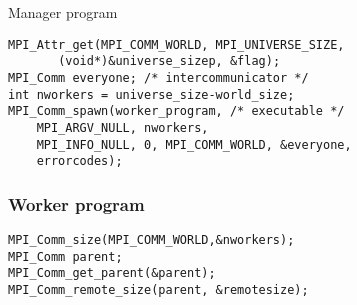 \begin{frame}[containsverbatim]{Manager program}
\begin{lstlisting}
MPI_Attr_get(MPI_COMM_WORLD, MPI_UNIVERSE_SIZE,
       (void*)&universe_sizep, &flag);
MPI_Comm everyone; /* intercommunicator */
int nworkers = universe_size-world_size;
MPI_Comm_spawn(worker_program, /* executable */
    MPI_ARGV_NULL, nworkers,
    MPI_INFO_NULL, 0, MPI_COMM_WORLD, &everyone,
    errorcodes);
\end{lstlisting}
\end{frame}

\begin{frame}[containsverbatim]\frametitle{Worker program}
\begin{lstlisting}
MPI_Comm_size(MPI_COMM_WORLD,&nworkers);
MPI_Comm parent;
MPI_Comm_get_parent(&parent);
MPI_Comm_remote_size(parent, &remotesize);
\end{lstlisting}
\end{frame}

\endinput

\begin{frame}[containsverbatim]\frametitle{}
\begin{lstlisting}
\end{lstlisting}
\end{frame}

